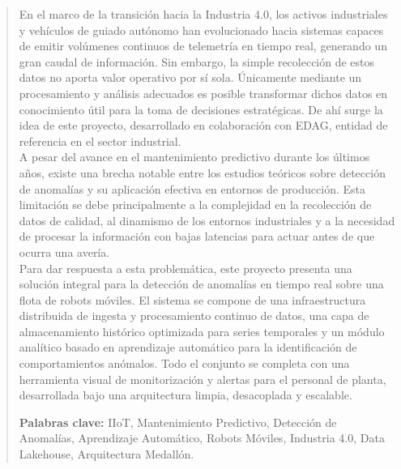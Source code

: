 \renewcommand{\abstractname}{Resumen}
\begin{abstract}
En el marco de la transición hacia la Industria 4.0, los activos industriales y vehículos de guiado autónomo han evolucionado hacia sistemas capaces de emitir volúmenes continuos de telemetría en tiempo real, generando un gran caudal de información. Sin embargo, la simple recolección de estos datos no aporta valor operativo por sí sola. Únicamente mediante un procesamiento y análisis adecuados es posible transformar dichos datos en conocimiento útil para la toma de decisiones estratégicas.
De ahí surge la idea de este proyecto, desarrollado en colaboración con EDAG, entidad de referencia en el sector industrial.\\ 

A pesar del avance en el mantenimiento predictivo durante los últimos años, existe una brecha notable entre los estudios teóricos sobre detección de anomalías y su aplicación efectiva en entornos de producción. Esta limitación se debe principalmente a la complejidad en la recolección de datos de calidad, al dinamismo de los entornos industriales y a la necesidad de procesar la información con bajas latencias para actuar antes de que ocurra una avería.\\

Para dar respuesta a esta problemática, este proyecto presenta una solución integral para la detección de anomalías en tiempo real sobre una flota de robots móviles. El sistema se compone de una infraestructura distribuida de ingesta y procesamiento continuo de datos, una capa de almacenamiento histórico optimizada para series temporales y un módulo analítico basado en aprendizaje automático para la identificación de comportamientos anómalos. Todo el conjunto se completa con una herramienta visual de monitorización y alertas para el personal de planta, desarrollada bajo una arquitectura limpia, desacoplada y escalable.

\medskip
\noindent\textbf{Palabras clave:} IIoT, Mantenimiento Predictivo, Detección de Anomalías, Aprendizaje Automático, Robots Móviles, Industria 4.0, Data Lakehouse, Arquitectura Medallón.
\end{abstract}